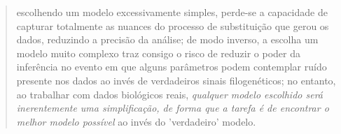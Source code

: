 \documentclass[english,brazilian]{UNISINOSmonografia} %
\begin{document}


\begin{quote}
	escolhendo um modelo excessivamente simples, perde-se a capacidade de capturar totalmente as nuances do processo de substituição que gerou os dados, reduzindo a precisão da análise;
	de modo inverso, a escolha um modelo muito complexo traz consigo o risco de reduzir o poder da inferência no evento em que alguns parâmetros podem contemplar ruído presente nos dados ao invés de verdadeiros sinais filogenéticos;
	no entanto, ao trabalhar com dados biológicos reais, \emph{qualquer modelo escolhido será inerentemente uma simplificação, de forma que a tarefa é de encontrar o melhor modelo possível} ao invés do 'verdadeiro' modelo.
\end{quote}


\end{document}
